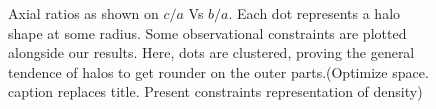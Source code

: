 \documentclass[a4paper,fleqn,usenatbib]{mnras}
\begin{document}
\begin{figure}
  \centering
  \hfill
  \hfill
  \caption{Axial ratios as shown on $c/a$ Vs $b/a$. Each dot represents a halo shape at some radius. Some observational constraints are plotted alongside our results. Here, dots are clustered, proving the general tendence of halos to get rounder on the outer parts.(Optimize space. caption replaces title.  Present constraints representation of density)}
  \label{fig:Triaxiality_Inner_Outer}
\end{figure}
\end{document}
